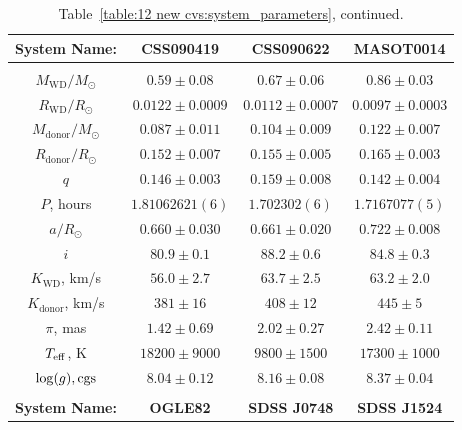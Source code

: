 \begin{table}
    \centering
    \caption{Table~\ref{table:12 new cvs:system_parameters}, continued.}
    \label{table:12 new cvs:system_parameters cont 1}
    \begin{tabular}{cccc}
        \hline
        \textbf{System Name:}      & \textbf{CSS090419}     & \textbf{CSS090622}    & \textbf{MASOT0014}     \\
        \hline \hline \\
        $M_\mathrm{WD}/M_\odot$    & $0.59\pm0.08$          & $0.67\pm0.06$         & $0.86\pm0.03$          \\
        $R_\mathrm{WD}/R_\odot$    & $0.0122\pm0.0009$      & $0.0112\pm0.0007$     & $0.0097\pm0.0003$      \\
        $M_\mathrm{donor}/M_\odot$ & $0.087\pm0.011$        & $0.104\pm0.009$       & $0.122\pm0.007$        \\
        $R_\mathrm{donor}/R_\odot$ & $0.152\pm0.007$        & $0.155\pm0.005$       & $0.165\pm0.003$        \\
        $q$                        & $0.146\pm0.003$        & $0.159\pm0.008$       & $0.142\pm0.004$        \\
        \hline
        $P$, hours                 & $1.81062621(6)$        & $1.702302(6)$         & $1.7167077(5)$         \\
        $a/R_\odot$                & $0.660\pm0.030$        & $0.661\pm0.020$       & $0.722\pm0.008$        \\
        $i$                        & $80.9\pm0.1$           & $88.2\pm0.6$          & $84.8\pm0.3$           \\
        $K_\mathrm{WD}$, km/s      & $56.0\pm2.7$           & $63.7\pm2.5$          & $63.2\pm2.0$           \\
        $K_\mathrm{donor}$, km/s   & $381\pm16$             & $408\pm12$            & $445\pm5$              \\
        \hline
        $\pi$, mas                 & $1.42\pm0.69$          & $2.02\pm0.27$         & $2.42\pm0.11$          \\
        $T_{\rm eff}$, K           & $18200\pm9000$         & $9800\pm1500$         & $17300\pm1000$         \\
        $\log(g), {\rm cgs}$       & $8.04\pm0.12$          & $8.16\pm0.08$         & $8.37\pm0.04$          \\
        \hline
        \hline \\[2em]
        \hline
        \textbf{System Name:}       & \textbf{OGLE82}   & \textbf{SDSS J0748}    & \textbf{SDSS J1524}     \\

\end{tabular}
\end{table}
